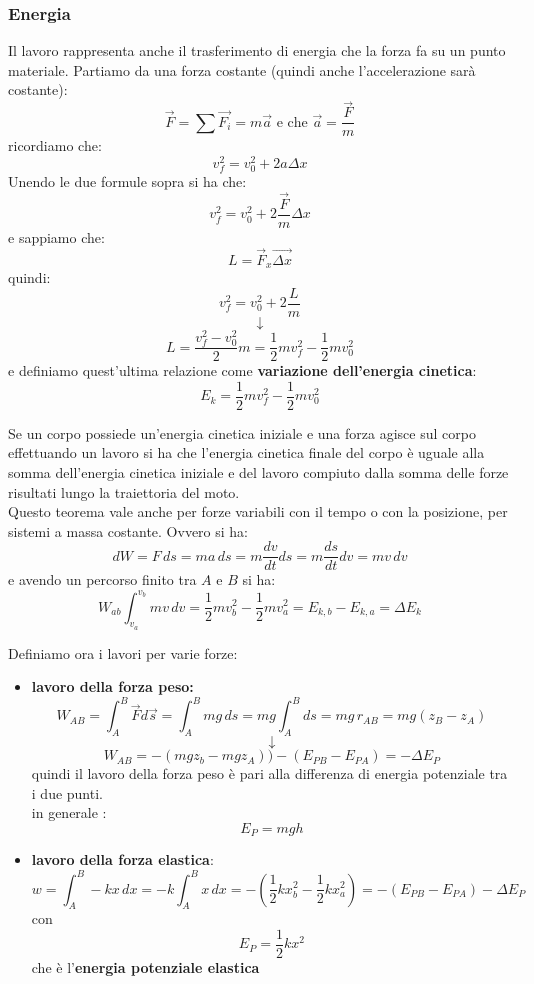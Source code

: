 \documentclass[a4paper,12pt, oneside]{book}
\begin{document}
\subsubsection{Energia}
Il lavoro rappresenta anche il trasferimento di energia che la forza fa su un punto materiale. Partiamo da una forza costante (quindi anche l'accelerazione sarà costante):
$$\vec{F}=\sum\vec{F_i}=m\vec{a} \mbox{ e che } \vec{a}=\frac{\vec{F}}{m}$$
ricordiamo che:
$$v_f^2=v_0^2+2a\Delta x$$
Unendo le due formule sopra si ha che:
$$v_f^2=v_0^2+2\frac{\vec{F}}{m}\Delta x$$
e sappiamo che:
$$L=\vec{F}_x\vec{\Delta x}$$
quindi:
$$v_f^2=v_0^2+2\frac{L}{m}$$
$$\downarrow$$
$$L=\frac{v_f^2-v_0^2}{2}m=\frac{1}{2}mv_f^2-\frac{1}{2}mv_0^2$$
e definiamo quest'ultima relazione come \textbf{variazione dell'energia cinetica}:
$$E_k=\frac{1}{2}mv_f^2-\frac{1}{2}mv_0^2$$
\begin{teorema}
Se un corpo possiede un'energia cinetica iniziale e una forza agisce sul corpo effettuando un lavoro si ha che l'energia cinetica finale del corpo è uguale alla somma dell'energia cinetica iniziale e del lavoro compiuto dalla somma delle forze risultati lungo la traiettoria del moto.\\
Questo teorema vale anche per forze variabili con il tempo o con la posizione, per sistemi a massa costante. Ovvero si ha:
$$dW=F\,ds=ma\,ds=m\frac{dv}{dt}ds=m\frac{ds}{dt}dv=mv\, dv$$
e avendo un percorso finito tra $A$ e $B$ si ha:
$$W_{ab}\int_{v_a}^{v_b}mv\,dv=\frac{1}{2}mv_b^2-\frac{1}{2}mv_a^2=E_{k,b}-E_{k,a}=\Delta E_k$$
\end{teorema}
Definiamo ora i lavori per varie forze:
\begin{itemize}
\item \textbf{lavoro della forza peso:}
$$W_{AB}=\int_A^B \vec{F}d\vec{s}=\int_A^B mg\, ds=mg\int_A^B ds=mg\,r_{AB}=mg(z_B-z_A)$$
$$\downarrow$$
$$W_{AB}=-(mgz_b-mgz_A))-(E_{PB}-E_{PA})=-\Delta E_P$$
quindi il lavoro della forza peso è pari alla differenza di energia potenziale tra i due punti.\\
in generale :
$$E_P=mgh$$
\item \textbf{lavoro della forza elastica}:
$$w=\int_A^B -kx\,dx=-k\int_A^Bx\,dx=-\left(\frac{1}{2}kx_b^2-\frac{1}{2}kx_a^2\right)=-(E_{PB}-E_{PA})-\Delta E_P$$
con 
$$E_P=\frac{1}{2}kx^2$$
che è l'\textbf{energia potenziale elastica}
\end{itemize}
\end{document}
